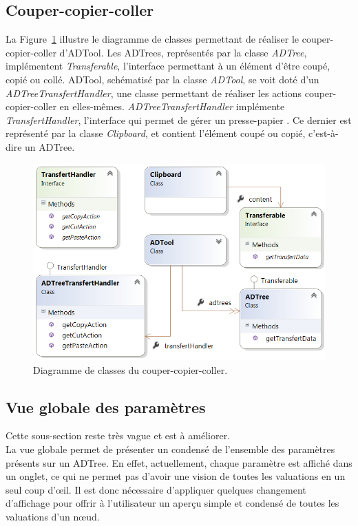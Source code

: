     \subsection{Couper-copier-coller}
		La {\sc Figure}~{\ref{fig:copiercoller}} illustre le diagramme de classes permettant de réaliser le couper-copier-coller d'ADTool. Les ADTrees, représentés par la classe \emph{ADTree}, implémentent \emph{Transferable}, l'interface permettant à un élément d'être coupé, copié ou collé. ADTool, schématisé par la classe \emph{ADTool}, se voit doté d'un \emph{ADTreeTransfertHandler}, une classe permettant de réaliser les actions couper-copier-coller en elles-mêmes. \emph{ADTreeTransfertHandler} implémente \emph{TransfertHandler}, l'interface qui permet de gérer un \og presse-papier \fg{}. Ce dernier est représenté par la classe \emph{Clipboard}, et contient l'élément coupé ou copié, c'est-à-dire un ADTree.
    	
    	\begin{figure}[H]
	        \centering
	        \includegraphics[height=0.6\textwidth]{figure/copiercoller.png}
	        \caption{Diagramme de classes du couper-copier-coller.}
	        \label{fig:copiercoller}
	    \end{figure}
	    
	\subsection{Vue globale des paramètres}
		Cette sous-section reste très vague et est à améliorer. \\ La vue globale permet de présenter un condensé de l'ensemble des paramètres présents sur un ADTree. En effet, actuellement, chaque paramètre est affiché dans un onglet, ce qui ne permet pas d'avoir une vision de toutes les valuations en un seul coup d'œil. Il est donc nécessaire d'appliquer quelques changement d'affichage pour offrir à l'utilisateur un aperçu simple et condensé de toutes les valuations d'un nœud.
	

